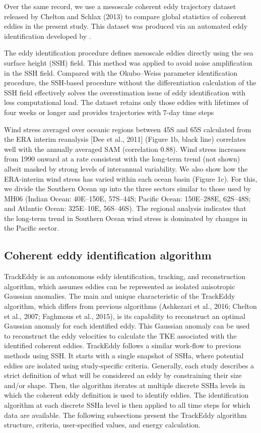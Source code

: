 \documentclass[draft,linenumbers]{agujournal2019}
\begin{document}
	Over the same record, we use a mesoscale coherent eddy trajectory dataset released by Chelton and Schlax (2013) to compare global statistics of coherent eddies in the present study. This dataset was produced via an automated eddy identification developed by \citet{Chelton_The_2011}. 
	
	The eddy identification procedure defines mesoscale eddies directly using the sea surface height (SSH) ﬁeld. This method was applied to avoid noise amplification in the SSH ﬁeld. Compared with the Okubo–Weiss parameter identification procedure, the SSH-based procedure without the differentiation calculation of the SSH ﬁeld effectively solves the overestimation issue of eddy identification with less computational load. The dataset retains only those eddies with lifetimes of four weeks or longer and provides trajectories with 7-day time steps 

	Wind stress averaged over oceanic regions between 45S and 65S calculated from the ERA interim reanalysis [Dee et al., 2011] (Figure 1b, black line) correlates well with the annually averaged SAM (correlation 0.88). Wind stress increases from 1990 onward at a rate consistent with the long-term trend (not shown) albeit masked by strong levels of interannual variability. We also show how the ERA-interim wind stress has varied within each ocean basin (Figure 1c). For this, we divide the Southern Ocean up into the three sectors similar to those used by MH06 (Indian Ocean: 40E–150E, 57S–44S; Paciﬁc Ocean: 150E–288E, 62S–48S; and Atlantic Ocean: 325E–10E, 56S–46S). The regional analysis indicates that the long-term trend in Southern Ocean wind stress is dominated by changes in the Paciﬁc sector.

	\subsection{Coherent eddy identification algorithm}
	TrackEddy is an autonomous eddy identification, tracking, and reconstruction algorithm, which assumes eddies can be represented as isolated anisotropic Gaussian anomalies. The main and unique characteristic of the TrackEddy algorithm, which differs from previous algorithms (Ashkezari et al., 2016; Chelton et al., 2007; Faghmous et al., 2015), is its capability to reconstruct an optimal Gaussian anomaly for each identified eddy. This Gaussian anomaly can be used to reconstruct the eddy velocities to calculate the TKE associated with the identified coherent eddies. TrackEddy follows a similar work‐ﬂow to previous methods using SSH. It starts with a single snapshot of SSHa, where potential eddies are isolated using study‐speciﬁc criteria. Generally, each study describes a strict definition of what will be considered an eddy by constraining their size and/or shape. Then, the algorithm iterates at multiple discrete SSHa levels in which the coherent eddy definition is used to identify eddies. The identification algorithm at each discrete SSHa level is then applied to all time steps for which data are available. The following subsections present the TrackEddy algorithm structure, criteria, user‐specified values, and energy calculation.
\end{document}

